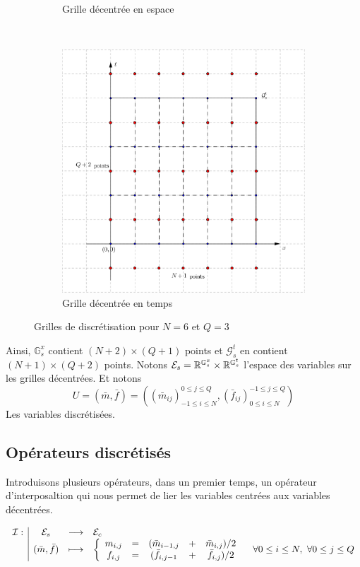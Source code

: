 \documentclass[a4paper,12pt]{article}
\begin{document}
\begin{figure}[!h]
\begin{subfigure}[b]{0.3\linewidth}
	\caption{Grille décentrée en espace}
	\label{fig:staggeredX}
	\end{subfigure}
	~
	\begin{subfigure}[b]{0.3\linewidth}
	\centering
	\includegraphics[width=0.9\linewidth]{img/grille_decentree_t.png}
	\caption{Grille décentrée en temps}
	\label{fig:staggeredT}
	\end{subfigure}
	\caption{Grilles de discrétisation pour $N=6$ et $Q=3$}
\end{figure}



Ainsi, $\mathbb{G}_s^x$ contient $(N+2)\times(Q+1)$ points et $\mathcal{G}_s^t$ en contient $(N+1)\times(Q+2)$ points. Notons $\mathcal{E}_s=\mathbb{R}^{\mathbb{G}_s^x}\times\mathbb{R}^{\mathbb{G}_s^t}$ l'espace des variables sur les grilles décentrées. Et notons 
$$
U=(\bar{m},\bar{f})=\left((\bar{m}_{ij})_{-1\leq i\leq N}^{0\leq j\leq Q}, (\bar{f}_{ij})_{0\leq i\leq N}^{-1\leq j\leq Q}\right)
$$
Les variables discrétisées. 

\subsection{Opérateurs discrétisés}
Introduisons plusieurs opérateurs, dans un premier temps, un opérateur d'interposaltion qui nous permet de lier les variables centrées aux variables décentrées. 

\begin{align}
\begin{array}[t]{l|ccl} \mathcal{I}: & \mathcal{E}_s & \longrightarrow & \mathcal{E}_c \\ & (\bar{m},\bar{f}) & \longmapsto & \left\{
\begin{array}{ccccc}
m_{i,j} &=& (\bar{m}_{i-1,j} &+& \bar{m}_{i,j})/2 \\
f_{i,j} &=& (\bar{f}_{i,j-1} &+& \bar{f}_{i,j})/2 \\
\end{array}
\right.
\quad \forall 0\leq i\leq N,\ \forall 0\leq j\leq Q \end{array}
\end{align}
\end{document}
